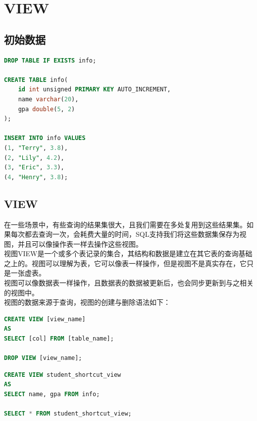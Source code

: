 \documentclass[12pt, openany, oneside]{book}
\begin{document}
\chapter{VIEW}

\section{初始数据}


\begin{lstlisting}[language=SQL]
DROP TABLE IF EXISTS info;

CREATE TABLE info(
    id int unsigned PRIMARY KEY AUTO_INCREMENT,
    name varchar(20),
    gpa double(5, 2)
);

INSERT INTO info VALUES
(1, "Terry", 3.8),
(2, "Lily", 4.2),
(3, "Eric", 3.3),
(4, "Henry", 3.8);
\end{lstlisting}

\section{VIEW}

在一些场景中，有些查询的结果集很大，且我们需要在多处复用到这些结果集。如果每次都去查询一次，会耗费大量的时间，SQL支持我们将这些数据集保存为视图，并且可以像操作表一样去操作这些视图。 \\

视图VIEW是一个或多个表记录的集合，其结构和数据是建立在其它表的查询基础之上的。视图可以理解为表，它可以像表一样操作，但是视图不是真实存在，它只是一张虚表。 \\

视图可以像数据表一样操作，且数据表的数据被更新后，也会同步更新到与之相关的视图中。 \\

视图的数据来源于查询，视图的创建与删除语法如下：

\vspace{-0.5cm}

\begin{lstlisting}[language=SQL]
CREATE VIEW [view_name] 
AS
SELECT [col] FROM [table_name];

DROP VIEW [view_name];
\end{lstlisting}

\vspace{0.5cm}


\begin{lstlisting}[language=SQL]
CREATE VIEW student_shortcut_view 
AS
SELECT name, gpa FROM info;

SELECT * FROM student_shortcut_view;
\end{lstlisting}
\end{document}
